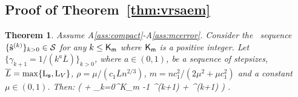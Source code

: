 \documentclass[11pt]{article}
\newtheorem*{Theorem*}{Theorem}
\theoremstyle{t}
\begin{document}
\subsection{Proof of Theorem~\ref{thm:vrsaem}}\label{app:theoremvrsaem}
\begin{Theorem*}
Assume A\ref{ass:compact}-A\ref{ass:mcerror}.
Consider the \SAEMVR\ sequence $\{\hat{\bss}^{(k)}\}_{k>0} \in \mathcal{S}$ for any $k \leq {\sf K}_{\sf m }$ where ${\sf K}_{\sf m }$ is a positive integer. 
Let $\{\gamma_{k+1} = 1/(k^a \overline{L})\}_{k>0}$, where $a \in (0,1)$, be a sequence of stepsizes, $\overline{L} = \max \{\Lip{\bss}, \Lip{V} \}$, $\rho = \mu/( c_1 \overline{L}  n^{2/3})$, $m = n c_1^2/(2 \mu^2+\mu c_1^2)$ and a constant $\mu \in (0,1)$. Then:
\beq\notag
\EE[ \| \grd V( \hs{K} ) \|^2 ] \leq  {}\left( \EE[ \Delta V ]+  \sum_{k=0}^{{\sf K}_{\sf m }-1}  \tilde{\eta}^{(k+1)}\hspace{-0.1cm} + \chi^{(k+1)} \EE[\| \hs{k} - \tilde{S}^{(k)}\|^2]\right)  \eqsp.
\eeq
\end{Theorem*} 
\end{document}
